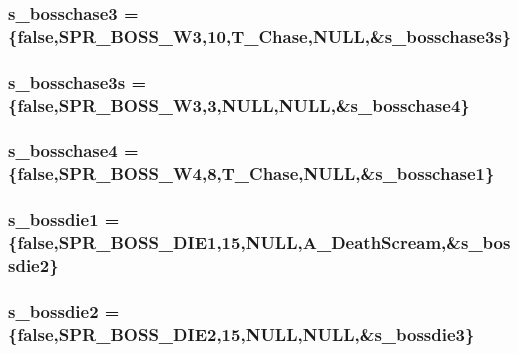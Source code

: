 \label{WL__ACT2_8C_ab62cb1d2594a942a726daa00a0d06bd8}
\hypertarget{WL__ACT2_8C_aa9c0a5be56f3585700c347f7a04e9cc5}{
\subsubsection[{s\_\-bosschase3}]{ {\bf s\_\-bosschase3} = \{false,SPR\_\-BOSS\_\-W3,10,T\_\-Chase,NULL,\&{\bf s\_\-bosschase3s}\}}}
\label{WL__ACT2_8C_aa9c0a5be56f3585700c347f7a04e9cc5}
\hypertarget{WL__ACT2_8C_a22cc872920a7b45a580d6527e2048420}{
\subsubsection[{s\_\-bosschase3s}]{ {\bf s\_\-bosschase3s} = \{false,SPR\_\-BOSS\_\-W3,3,NULL,NULL,\&{\bf s\_\-bosschase4}\}}}
\label{WL__ACT2_8C_a22cc872920a7b45a580d6527e2048420}
\hypertarget{WL__ACT2_8C_aeef05840498077842df12b23285dabcb}{
\subsubsection[{s\_\-bosschase4}]{ {\bf s\_\-bosschase4} = \{false,SPR\_\-BOSS\_\-W4,8,T\_\-Chase,NULL,\&{\bf s\_\-bosschase1}\}}}
\label{WL__ACT2_8C_aeef05840498077842df12b23285dabcb}
\hypertarget{WL__ACT2_8C_a154c6599f4cf6660a5c19ed11a022f38}{
\subsubsection[{s\_\-bossdie1}]{ {\bf s\_\-bossdie1} = \{false,SPR\_\-BOSS\_\-DIE1,15,NULL,A\_\-DeathScream,\&{\bf s\_\-bossdie2}\}}}
\label{WL__ACT2_8C_a154c6599f4cf6660a5c19ed11a022f38}
\hypertarget{WL__ACT2_8C_a8e438ad726c055153a6e3bf78abb75c9}{
\subsubsection[{s\_\-bossdie2}]{ {\bf s\_\-bossdie2} = \{false,SPR\_\-BOSS\_\-DIE2,15,NULL,NULL,\&{\bf s\_\-bossdie3}\}}}

